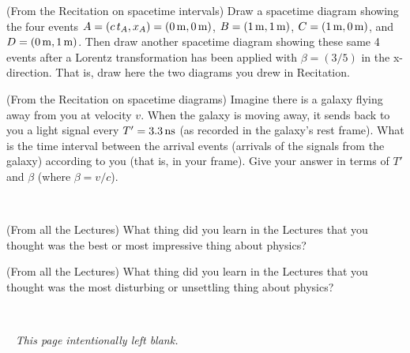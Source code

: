 \documentclass[12pt, letterpaper]{article}
\begin{document}
\vfill

\begin{problem} (From the Recitation on spacetime intervals)
  Draw a spacetime diagram showing the four events
  $A=(c\,t_A,x_A)=(0\,\mathrm{m},0\,\mathrm{m})$, $B=(1\,\mathrm{m},1\,\mathrm{m})$, $C=(1\,\mathrm{m},0\,\mathrm{m})$,
  and $D=(0\,\mathrm{m},1\,\mathrm{m})$.
  Then draw another spacetime diagram showing these same 4 events
  after a Lorentz transformation has been applied with $\beta=(3/5)$ in the x-direction.
  That is, draw here the two diagrams you drew in Recitation.
\end{problem}

\vfill

\begin{problem} (From the Recitation on spacetime diagrams)
  Imagine there is a galaxy flying away from you at velocity $v$.
  When the galaxy is moving away, it sends back to you a light
  signal every $T'=3.3\,\mathrm{ns}$ (as recorded in the galaxy's rest frame).
  What is the time interval between the arrival events (arrivals of
  the signals from the galaxy) according to you (that is, in your
  frame). Give your answer in terms of $T'$ and $\beta$ (where $\beta=v/c$).
\end{problem}

\vfill
~\clearpage

\begin{problem} (From all the Lectures)
  What thing did you learn in the Lectures that you thought was the best or most impressive thing about physics?
\end{problem}

\vfill

\begin{problem} (From all the Lectures)
  What thing did you learn in the Lectures that you thought was the most disturbing or unsettling thing about physics?
\end{problem}

\vfill
~\clearpage

~
\vfill
\textsl{This page intentionally left blank.}
\vfill
~
\end{document}
